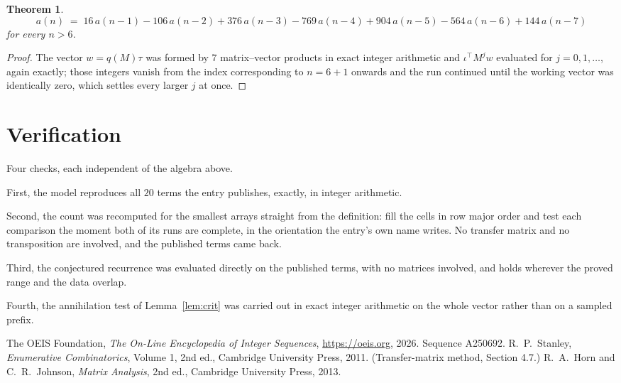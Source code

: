 \documentclass[11pt,a4paper]{article}
\theoremstyle{plain}
\newtheorem{theorem}{Theorem}
\theoremstyle{definition}
\begin{document}
\begin{theorem}
\[
a(n)\;=\;16\,a(n-1) - 106\,a(n-2) + 376\,a(n-3) - 769\,a(n-4) + 904\,a(n-5) - 564\,a(n-6) + 144\,a(n-7)
\]
for every $n>6$.
\end{theorem}

\begin{proof}
The vector $w=q(M)\tau$ was formed by $7$ matrix--vector products in exact integer
arithmetic and $\iota^{\!\top}M^{j}w$ evaluated for $j=0,1,\dots$, again exactly; those
integers vanish from the index corresponding to $n=6+1$ onwards and the run continued
until the working vector was identically zero, which settles every larger $j$ at once.
\end{proof}

\section{Verification}

Four checks, each independent of the algebra above.

First, the model reproduces all $20$ terms the entry publishes, exactly, in integer
arithmetic.

Second, the count was recomputed for the smallest arrays straight from the definition: fill the
cells in row major order and test each comparison the moment both of its runs are complete,
in the orientation the entry's own name writes. No transfer matrix and no transposition are
involved, and the published terms came back.

Third, the conjectured recurrence was evaluated directly on the published terms, with no
matrices involved, and holds wherever the proved range and the data overlap.

Fourth, the annihilation test of Lemma~\ref{lem:crit} was carried out in exact integer
arithmetic on the whole vector rather than on a sampled prefix.

\begin{thebibliography}{9}
 The OEIS Foundation, \emph{The On-Line Encyclopedia of Integer
Sequences}, \url{https://oeis.org}, 2026. Sequence A250692.
 R.~P.~Stanley, \emph{Enumerative Combinatorics}, Volume 1, 2nd ed.,
Cambridge University Press, 2011. (Transfer-matrix method, Section 4.7.)
 R.~A.~Horn and C.~R.~Johnson, \emph{Matrix Analysis}, 2nd ed., Cambridge
University Press, 2013.
\end{thebibliography}
\end{document}
